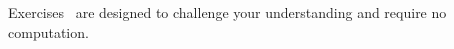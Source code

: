{\noindent Exercises}
{\ are designed to challenge your understanding and require no computation.
}
